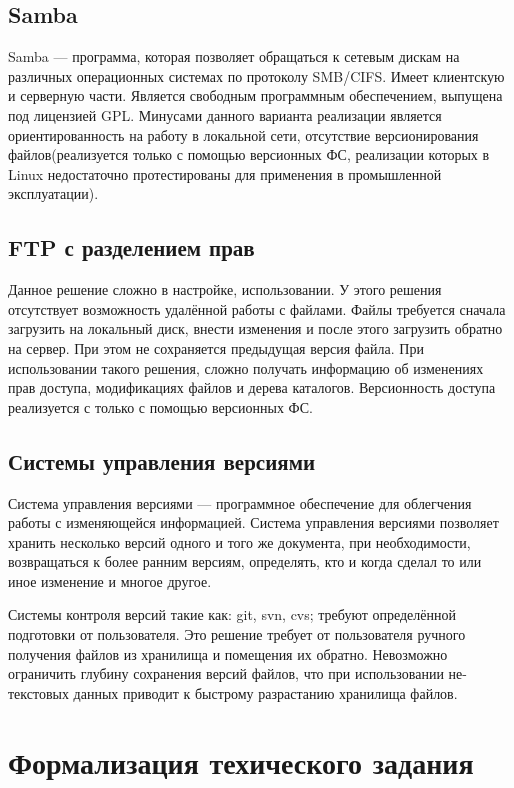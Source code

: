 \documentclass[utf8,usehyperref,12pt]{G7-32}
\begin{document}
\subsection{Samba}

Samba — программа, которая позволяет обращаться к сетевым дискам на различных операционных системах по протоколу SMB/CIFS. 
Имеет клиентскую и серверную части. Является свободным программным обеспечением, выпущена под лицензией GPL.
Минусами данного варианта реализации является ориентированность на работу в локальной сети, отсутствие версионирования файлов(реализуется только с помощью версионных ФС, реализации которых в Linux недостаточно протестированы для применения в промышленной эксплуатации).

\subsection{FTP с разделением прав}

Данное решение сложно в настройке, использовании. У этого решения отсутствует возможность 
удалённой работы с файлами. Файлы требуется сначала загрузить на локальный диск, внести 
изменения и после этого загрузить обратно на сервер. При этом не сохраняется предыдущая версия файла. При использовании такого решения, сложно получать информацию об изменениях прав доступа, модификациях файлов и дерева каталогов. Версионность доступа реализуется с только с помощью версионных ФС.

\subsection{Системы управления версиями}
Система управления версиями — программное обеспечение для облегчения работы с изменяющейся информацией. Система управления версиями позволяет хранить несколько версий одного и того же документа, при необходимости, возвращаться к более ранним версиям, определять, кто и когда сделал то или иное изменение и многое другое.

Системы контроля версий такие как: git, svn, cvs; требуют определённой подготовки от пользователя. Это решение требует от пользователя ручного получения файлов из хранилища и помещения их обратно. Невозможно ограничить глубину сохранения версий файлов, что при использовании не-текстовых данных приводит к быстрому разрастанию хранилища файлов.

\section{Формализация техического задания}
\end{document}
